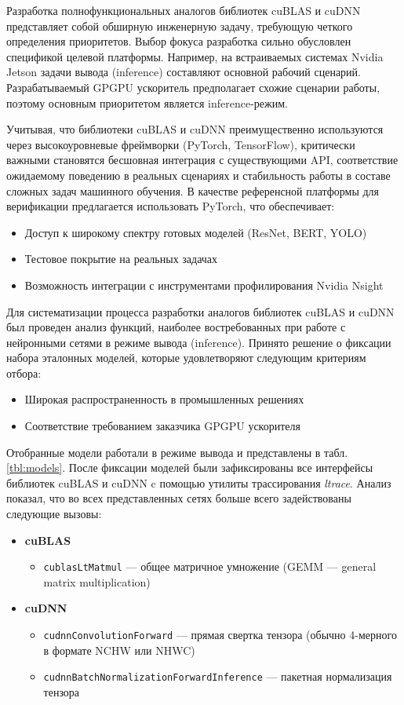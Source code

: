 Разработка полнофункциональных аналогов библиотек cuBLAS и cuDNN представляет собой
обширную инженерную задачу, требующую четкого определения приоритетов. Выбор фокуса разработка сильно обусловлен
спецификой целевой платформы. Например, на встраиваемых системах Nvidia Jetson задачи вывода (inference) составляют основной
рабочий сценарий. Разрабатываемый GPGPU ускоритель предполагает схожие сценарии работы, поэтому основным приоритетом является
inference-режим.

Учитывая, что библиотеки cuBLAS и cuDNN преимущественно используются через высокоуровневые фреймворки (PyTorch, TensorFlow),
критически важными становятся бесшовная интеграция с существующими API, соответствие ожидаемому поведению в реальных сценариях
и стабильность работы в составе сложных задач машинного обучения. В качестве референсной платформы для верификации предлагается
использовать PyTorch, что обеспечивает:
\begin{itemize}
\item Доступ к широкому спектру готовых моделей (ResNet, BERT, YOLO)
\item Тестовое покрытие на реальных задачах
\item Возможность интеграции с инструментами профилирования Nvidia Nsight \cite{nsight_systems_2025}
\end{itemize}
Для систематизации процесса разработки аналогов библиотек cuBLAS и cuDNN был проведен анализ функций,
наиболее востребованных при работе с нейронными сетями в режиме вывода (inference).
Принято решение о фиксации набора эталонных моделей, которые удовлетворяют следующим критериям отбора:
\begin{itemize}
    \item Широкая распространенность в промышленных решениях
    \item Соответствие требованием заказчика GPGPU ускорителя
\end{itemize}

Отобранные модели работали в режиме вывода и представлены в табл. \ref{tbl:models}. После фиксации моделей
были зафиксированы все интерфейсы библиотек cuBLAS и cuDNN c помощью утилиты трассирования \textit{ltrace}.
Анализ показал, что во всех представленных сетях больше всего задействованы следующие вызовы:
\begin{itemize}
   \item \textbf{cuBLAS}
    \begin{itemize}
        \item \texttt{cublasLtMatmul} — общее матричное умножение (GEMM — general matrix multiplication)
    \end{itemize}

    \item \textbf{cuDNN}
    \begin{itemize}
        \item \texttt{cudnnConvolutionForward} — прямая свертка тензора (обычно 4-мерного в формате NCHW или NHWC)
        \item \texttt{cudnnBatchNormalizationForwardInference} — пакетная нормализация тензора
    \end{itemize}
\end{itemize}

